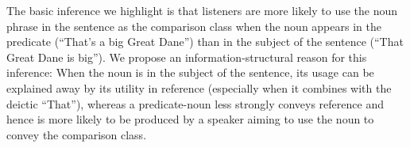 \documentclass[a4paper,man,natbib]{apa6}
\begin{document}

The basic inference we highlight is that listeners are more likely to use the noun phrase in the sentence as the comparison class when the noun appears in the predicate (``That's a big Great Dane'') than in the subject of the sentence (``That Great Dane is big''). We propose an information-structural reason for this inference: When the noun is in the subject of the sentence, its usage can be explained away by its utility in reference  (especially when it combines with the deictic ``That''), whereas a predicate-noun less strongly conveys reference and hence is more likely to be produced by a speaker aiming to use the noun to convey the comparison class. 

 
\end{document}
